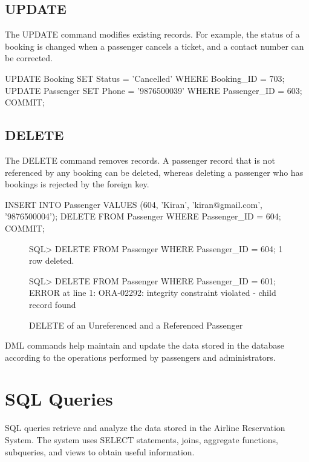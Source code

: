 \documentclass[12pt,a4paper]{article}
\begin{document}
\subsection{UPDATE}
The UPDATE command modifies existing records. For example, the status of a booking is changed when a
passenger cancels a ticket, and a contact number can be corrected.
\begin{code}
UPDATE Booking   SET Status = 'Cancelled' WHERE Booking_ID = 703;
UPDATE Passenger SET Phone = '9876500039' WHERE Passenger_ID = 603;
COMMIT;
\end{code}

\subsection{DELETE}
The DELETE command removes records. A passenger record that is not referenced by any booking can be
deleted, whereas deleting a passenger who has bookings is rejected by the foreign key.
\begin{code}
INSERT INTO Passenger VALUES (604, 'Kiran', 'kiran@gmail.com', '9876500004');
DELETE FROM Passenger WHERE Passenger_ID = 604;
COMMIT;
\end{code}
\begin{figure}[H]
\begin{terminal}
SQL> DELETE FROM Passenger WHERE Passenger_ID = 604;
1 row deleted.

SQL> DELETE FROM Passenger WHERE Passenger_ID = 601;
ERROR at line 1:
ORA-02292: integrity constraint violated - child record found
\end{terminal}
\caption{DELETE of an Unreferenced and a Referenced Passenger}
\end{figure}
DML commands help maintain and update the data stored in the database according to the operations
performed by passengers and administrators.

\section{SQL Queries}
SQL queries retrieve and analyze the data stored in the Airline Reservation System. The system uses SELECT
statements, joins, aggregate functions, subqueries, and views to obtain useful information.
\end{document}
